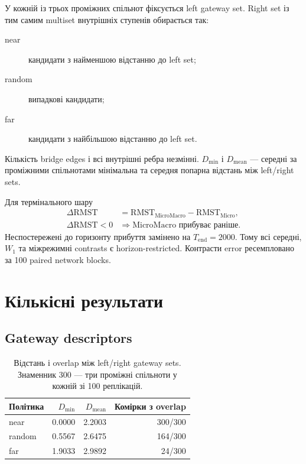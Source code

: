 \documentclass[11pt,a4paper]{article}
\begin{document}
У кожній із трьох проміжних спільнот фіксується left gateway set. Right set
із тим самим multiset внутрішніх ступенів обирається так:
\begin{description}
  \item[near] кандидати з найменшою відстанню до left set;
  \item[random] випадкові кандидати;
  \item[far] кандидати з найбільшою відстанню до left set.
\end{description}
Кількість bridge edges і всі внутрішні ребра незмінні. $D_{\min}$ і
$D_{\mathrm{mean}}$ --- середні за проміжними спільнотами мінімальна та
середня попарна відстань між left/right sets.

Для термінального шару
\[
 \begin{aligned}
 \Delta\mathrm{RMST}
   &=\mathrm{RMST}_{\mathrm{MicroMacro}}-\mathrm{RMST}_{\mathrm{Micro}},\\
 \Delta\mathrm{RMST}<0
   &\Longrightarrow \text{MicroMacro прибуває раніше}.
 \end{aligned}
\]
Неспостережені до горизонту прибуття замінено на $T_{\mathrm{end}}=2000$.
Тому всі середні, $W_1$ та міжрежимні contrasts є horizon-restricted.
Контрасти error ресемпловано за 100 paired network blocks.

\section{Кількісні результати}\label{sec:results}

\subsection{Gateway descriptors}

\begin{table}[H]
\centering
\caption{Відстань і overlap між left/right gateway sets. Знаменник 300 ---
три проміжні спільноти у кожній зі 100 реплікацій.}
\label{tab:descriptors}
\begin{tabular}{lrrr}
\toprule
Політика & $D_{\min}$ & $D_{\mathrm{mean}}$ & Комірки з overlap \\
\midrule
near   & 0.0000 & 2.2003 & 300/300 \\
random & 0.5567 & 2.6475 & 164/300 \\
far    & 1.9033 & 2.9892 & 24/300 \\
\bottomrule
\end{tabular}
\end{table}
\end{document}
